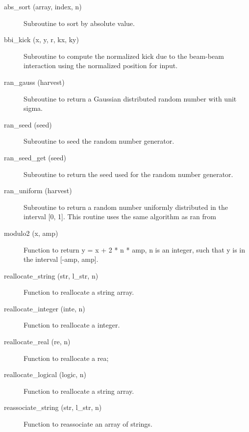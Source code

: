 \begin{description}

\item[abs\_sort (array, index, n)] \Newline 
  Subroutine to sort by absolute value.

\item[bbi\_kick (x, y, r, kx, ky)] \Newline 
Subroutine to compute the normalized kick due to the beam-beam
interaction using the normalized position for input.

\item[ran\_gauss (harvest)] \Newline 
Subroutine to return a Gaussian distributed random number with unit sigma.

\item[ran\_seed (seed)] \Newline 
Subroutine to seed the random number generator. 

\item[ran\_seed\_get (seed)] \Newline 
Subroutine to return the seed used for the random number generator.

\item[ran\_uniform (harvest)] \Newline 
Subroutine to return a random number uniformly distributed in the 
interval [0, 1]. This routine uses the same algorithm as ran from

\item[modulo2 (x, amp)] \Newline 
Function to return y = x + 2 * n * amp, n is an integer, such that y is 
in the interval [-amp, amp].

\item[reallocate\_string (str, l\_str, n)] \Newline 
Function to reallocate a string array.

\item[reallocate\_integer (inte, n)] \Newline 
Function to reallocate a integer.

\item[reallocate\_real (re, n)] \Newline 
Function to reallocate a rea;

\item[reallocate\_logical (logic, n)] \Newline 
Function to reallocate a string array.

\item[reassociate\_string (str, l\_str, n)] \Newline 
Function to reassociate an array of strings.


\end{description}
